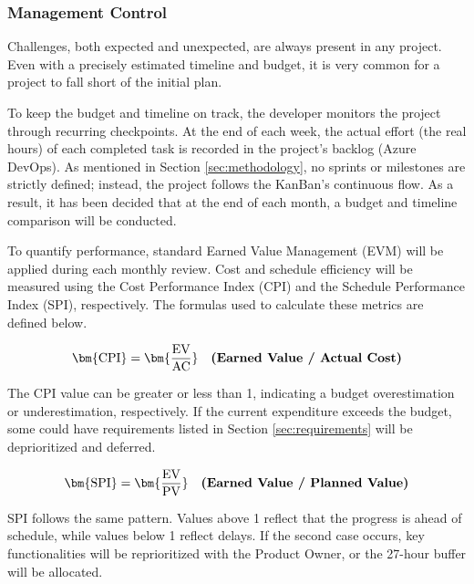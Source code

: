 \subsubsection{Management Control}

Challenges, both expected and unexpected, are always present in any project. Even with a precisely estimated timeline and budget, it is very common for a project to fall short of the initial plan. 

To keep the budget and timeline on track, the developer monitors the project through recurring checkpoints. At the end of each week, the actual effort (the real hours) of each completed task is recorded in the project’s backlog (Azure DevOps). As mentioned in Section \ref{sec:methodology}, no sprints or milestones are strictly defined; instead, the project follows the KanBan’s continuous flow. As a result, it has been decided that at the end of each month, a budget and timeline comparison will be conducted.

To quantify performance, standard Earned Value Management (EVM) will be applied during each monthly review. Cost and schedule efficiency will be measured using the Cost Performance Index (CPI) and the Schedule Performance Index (SPI), respectively. The formulas used to calculate these metrics are defined below. 

\vspace{-10pt}

\[
\bm{\mathrm{CPI}} = \bm{\frac{\mathrm{EV}}{\mathrm{AC}}}
\quad \text{\bfseries (Earned Value / Actual Cost)}
\]

\vspace{-5pt}


The CPI value can be greater or less than 1, indicating a budget overestimation or underestimation, respectively. If the current expenditure exceeds the budget, some could have requirements listed in Section \ref{sec:requirements} will be deprioritized and deferred.

\vspace{-10pt}
\[
\bm{\mathrm{SPI}} = \bm{\frac{\mathrm{EV}}{\mathrm{PV}}}
\quad \text{\bfseries (Earned Value / Planned Value)}
\]

\vspace{-5pt}

SPI follows the same pattern. Values above 1 reflect that the progress is ahead of schedule, while values below 1 reflect delays. If the second case occurs, key functionalities will be reprioritized with the Product Owner, or the 27-hour buffer will be allocated.

